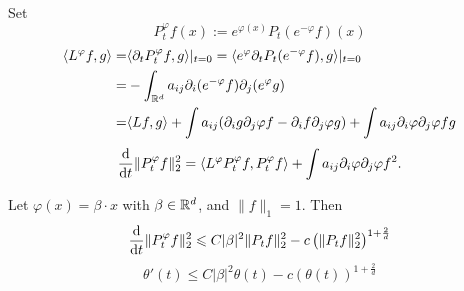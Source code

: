 \medskip
Set 
\[
P_{t}^{\varphi} f(x) := e^{\varphi (x)} P_{t}(e^{-\varphi} f)(x)
\]
\begin{equation}
    \begin{aligned}
        \langle L^{\varphi} f, g \rangle =& \langle \partial_{t} P_{t}^{\varphi} f, g \rangle|_{t=0} = \langle e^{\varphi} \partial_{t} P_{t}(e^{-\varphi} f), g \rangle|_{t=0}\\
        =& -\int_{{\mathbb R}^d}a_{ij} \partial_{i} (e^{-\varphi} f) \partial_{j} (e^{\varphi} g) \\
        =& \langle L f, g \rangle + \int a_{ij} (\partial_i g\partial_j\varphi f-\partial_i f\partial_j\varphi g) + \int a_{ij} \partial_i\varphi \partial_j \varphi fg
    \end{aligned}
\end{equation}
\[
\frac{\text{\rm{d}} }{\text{\rm{d}} t}\|P_t^\varphi f\|_2^2=\langle L^\varphi P^\varphi_t f, P^\varphi_t f\rangle + \int a_{ij} \partial_i\varphi \partial_j \varphi f^2. 
\]

Let \(\varphi(x)=\beta\cdot x\) with \(\beta\in {\mathbb R}^d\), and \(\|f\|_1=1\). Then 
\[
\frac{\text{\rm{d}} }{\text{\rm{d}} t}\|P_t^\varphi f\|_2^2\leqslant C |\beta|^2 \|P_t f\|_2^2 -c\left( \|P_t f \|_2^2 \right)^{1+\frac{2}{d}} 
\]
\[
\theta'(t)\leq C |\beta|^2 \theta(t)-c(\theta(t))^{1+\frac{2}{d}}
\]
